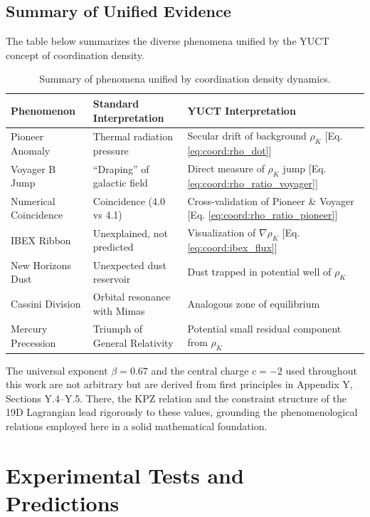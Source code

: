\documentclass[12pt,a4paper]{article}
\theoremstyle{remark}
\begin{document}
	\subsection{Summary of Unified Evidence}
	
	The table below summarizes the diverse phenomena unified by the YUCT concept of coordination density.
	
	\begin{table}[htbp]
		\centering
		\caption{Summary of phenomena unified by coordination density dynamics.}
		\label{tab:coord:summary}
		\begin{tabular}{|p{4.5cm}|p{4.5cm}|p{5cm}|}
			\hline
			\textbf{Phenomenon} & \textbf{Standard Interpretation} & \textbf{YUCT Interpretation} \\
			\hline
			Pioneer Anomaly & Thermal radiation pressure & Secular drift of background \(\rho_K\) [Eq. \ref{eq:coord:rho_dot}] \\
			\hline
			Voyager B Jump & ``Draping'' of galactic field & Direct measure of \(\rho_K\) jump [Eq. \ref{eq:coord:rho_ratio_voyager}] \\
			\hline
			Numerical Coincidence & Coincidence (4.0 vs 4.1) & Cross-validation of Pioneer \& Voyager [Eq. \ref{eq:coord:rho_ratio_pioneer}] \\
			\hline
			IBEX Ribbon & Unexplained, not predicted & Visualization of \(\nabla \rho_K\) [Eq. \ref{eq:coord:ibex_flux}] \\
			\hline
			New Horizons Dust & Unexpected dust reservoir & Dust trapped in potential well of \(\rho_K\) \\
			\hline
			Cassini Division & Orbital resonance with Mimas & Analogous zone of equilibrium  \\
			\hline
			Mercury Precession & Triumph of General Relativity & Potential small residual component from \(\rho_K\) \\
			\hline
		\end{tabular}
	\end{table}
	
	The universal exponent \(\beta = 0.67\) and the central charge \(c = -2\) used throughout this work are not arbitrary but are derived from first principles in Appendix Y, Sections Y.4–Y.5. There, the KPZ relation and the constraint structure of the 19D Lagrangian lead rigorously to these values, grounding the phenomenological relations employed here in a solid mathematical foundation.
	
	\section{Experimental Tests and Predictions}
	\label{sec:experimental-tests}
	
\end{document}
